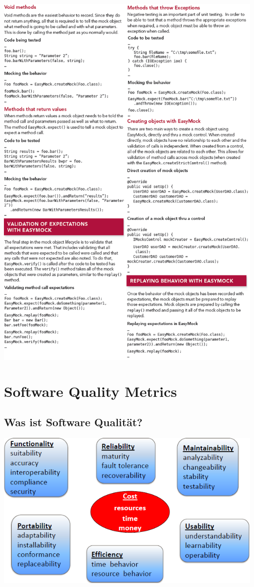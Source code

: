 \documentclass[a4paper,10pt]{article}
\begin{document}
\includegraphics[scale=0.8]{EasyMockStuff.png}

\pagebreak
\section{Software Quality Metrics}
\subsection{Was ist Software Qualit\"{a}t?}
\includegraphics[scale=1]{Metrics.png}
\end{document}
